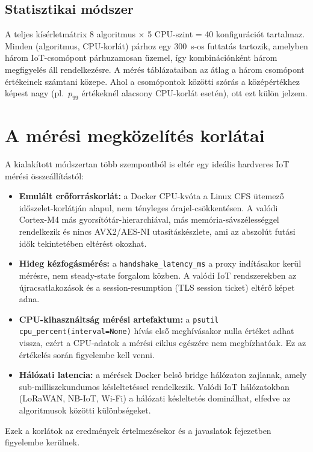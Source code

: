 \subsection{Statisztikai módszer}

A teljes kísérletmátrix 8 algoritmus $\times$ 5 CPU-szint = 40 konfigurációt tartalmaz.
Minden (algoritmus, CPU-korlát) párhoz egy 300~s-os futtatás tartozik, amelyben három
IoT-csomópont párhuzamosan üzemel, így kombinációnként három megfigyelés áll
rendelkezésre. A mérés táblázataiban az átlag a három csomópont értékeinek számtani
közepe. Ahol a csomópontok közötti szórás a középértékhez képest nagy
(pl.\ $p_{99}$ értékeknél alacsony CPU-korlát esetén), ott ezt külön jelzem.

\section{A mérési megközelítés korlátai}

A kialakított módszertan több szempontból is eltér egy ideális hardveres IoT mérési
összeállítástól:

\begin{itemize}
    \item \textbf{Emulált erőforráskorlát:} a Docker CPU-kvóta a Linux CFS ütemező
          időszelet-korlátján alapul, nem tényleges órajel-csökkentésen. A valódi
          Cortex-M4 más gyorsítótár-hierarchiával, más memória-sávszélességgel rendelkezik és
          nincs AVX2/AES-NI utasításkészlete, ami az abszolút futási idők tekintetében
          eltérést okozhat.
    \item \textbf{Hideg kézfogásmérés:} a \texttt{handshake\_latency\_ms} a proxy
          indításakor kerül mérésre, nem steady-state forgalom közben. A valódi
          IoT rendszerekben az újracsatlakozások és a session-resumption (TLS session
          ticket) eltérő képet adna.
    \item \textbf{CPU-kihasználtság mérési artefaktum:} a \texttt{psutil}
          \texttt{cpu\_percent(interval=None)} hívás első meghívásakor nulla értéket
          adhat vissza, ezért a CPU-adatok a mérési ciklus egészére nem megbízhatóak.
          Ez az értékelés során figyelembe kell venni.
    \item \textbf{Hálózati latencia:} a mérések Docker belső bridge hálózaton zajlanak,
          amely sub-milliszekundumos késleltetéssel rendelkezik. Valódi IoT hálózatokban
          (LoRaWAN, NB-IoT, Wi-Fi) a hálózati késleltetés dominálhat, elfedve az
          algoritmusok közötti különbségeket.
\end{itemize}

Ezek a korlátok az eredmények értelmezésekor és a javaslatok fejezetben figyelembe
kerülnek.
